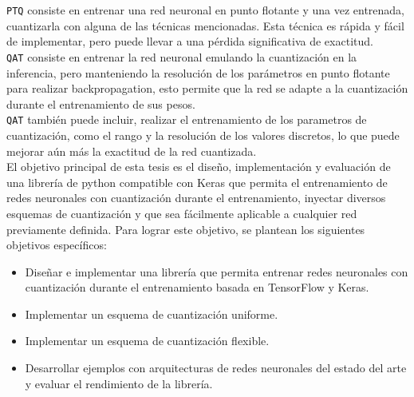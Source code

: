 \texttt{PTQ} consiste en entrenar una red neuronal en punto flotante y una vez entrenada, cuantizarla con alguna de las técnicas mencionadas. Esta técnica es rápida y fácil de implementar, pero puede llevar a una pérdida significativa de exactitud. \\

\texttt{QAT} consiste en entrenar la red neuronal emulando la cuantización en la inferencia, pero manteniendo la resolución de los parámetros en punto flotante para realizar backpropagation, esto permite que la red se adapte a la cuantización durante el entrenamiento de sus pesos. \\

\texttt{QAT} también puede incluir, realizar el entrenamiento de los parametros de cuantización, como el rango y la resolución de los valores discretos, lo que puede mejorar aún más la exactitud de la red cuantizada. \\


El objetivo principal de esta tesis es el diseño, implementación y evaluación de una librería de python compatible con Keras que permita el entrenamiento de redes neuronales con cuantización durante el entrenamiento, inyectar diversos esquemas de cuantización y que sea fácilmente aplicable a cualquier red previamente definida. Para lograr este objetivo, se plantean los siguientes objetivos específicos:

\begin{itemize}
    \item Diseñar e implementar una librería que permita entrenar redes neuronales con cuantización durante el entrenamiento basada en TensorFlow y Keras.
    \item Implementar un esquema de cuantización uniforme.
    \item Implementar un esquema de cuantización flexible.
    \item Desarrollar ejemplos con arquitecturas de redes neuronales del estado del arte y evaluar el rendimiento de la librería.
\end{itemize}

